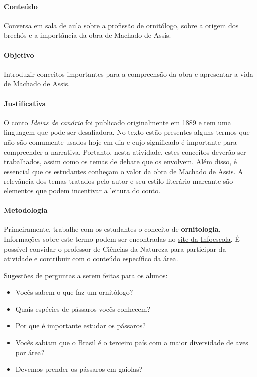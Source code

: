 \documentclass[11pt]{extarticle}
\begin{document}
\paragraph{Conteúdo} Conversa em sala de aula sobre a profissão de ornitólogo, sobre a origem dos brechós e a importância da obra de Machado de Assis.

\paragraph{Objetivo} Introduzir conceitos importantes para a compreensão da obra e apresentar a vida de Machado de Assis.

\paragraph{Justificativa} O conto \textit{Ideias de canário} foi publicado originalmente em 1889 e tem uma linguagem que pode ser desafiadora. No texto estão presentes alguns termos que não são comumente usados hoje em dia e cujo significado é importante para compreender a narrativa. Portanto, nesta atividade, estes conceitos deverão ser trabalhados, assim como os temas de debate que os envolvem. Além disso, é essencial que os estudantes conheçam o valor da obra de Machado de Assis. A relevância dos temas tratados pelo autor e seu estilo literário marcante são elementos que podem incentivar a leitura do conto. 

\paragraph{Metodologia} Primeiramente, trabalhe com os estudantes o conceito de \textbf{ornitologia}. Informações sobre este termo podem ser encontradas no \href{https://www.infoescola.com/biologia/ornitologia/}{site da Infoescola}. É possível convidar o professor de Ciências da Natureza para participar da atividade e contribuir com o conteúdo específico da área.


Sugestões de perguntas a serem feitas para os alunos:

\begin{itemize}

\item Vocês sabem o que faz um ornitólogo?

\item Quais espécies de pássaros vocês conhecem?

\item Por que é importante estudar os pássaros?

\item Vocês sabiam que o Brasil é o terceiro país com a maior diversidade de aves por área?

\item Devemos prender os pássaros em gaiolas?

\end{itemize}
\end{document}
